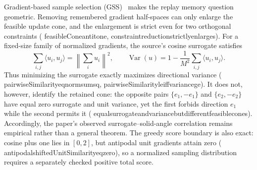 \documentclass[11pt]{article}
\newcommand{\leanname}[1]{{\scriptsize\ttfamily
  \def\_{\textunderscore\allowbreak}#1}}
\begin{document}
Gradient-based sample selection (GSS)~\cite{aljundi2019gss} makes the replay
memory question geometric.  Removing remembered gradient half-spaces can only
enlarge the feasible update cone, and the enlargement is strict even for two
orthogonal constraints
(\leanname{feasibleCone\_antitone},
\leanname{constraint\_reduction\_strictly\_enlarges}).  For a
fixed-size family of normalized gradients, the source's cosine surrogate
satisfies
\[
  \sum_{i,j}\langle u_i,u_j\rangle
    = \left\|\sum_i u_i\right\|^2,\qquad
  \operatorname{Var}(u)
    = 1-\frac{1}{M^2}\sum_{i,j}\langle u_i,u_j\rangle .
\]
Thus minimizing the surrogate exactly maximizes directional variance
(\leanname{pairwiseSimilarity\_eq\_norm\_sum\_sq},
\leanname{pairwiseSimilarity\_le\_iff\_variance\_ge}).  It does not,
however, identify the retained cone: the opposite pairs
$\{e_1,-e_1\}$ and $\{e_2,-e_2\}$ have equal zero surrogate and unit
variance, yet the first forbids direction $e_1$ while the second permits it
(\leanname{equal\_surrogate\_and\_variance\_but\_different\_feasible\_cones}).
Accordingly, the paper's observed surrogate--solid-angle correlation remains
empirical rather than a general theorem.  The greedy score boundary is also
exact: cosine plus one lies in $[0,2]$, but antipodal unit gradients attain
zero
(\leanname{antipodal\_shiftedUnitSimilarity\_eq\_zero}), so a normalized
sampling distribution requires a separately checked positive total score.
\end{document}
